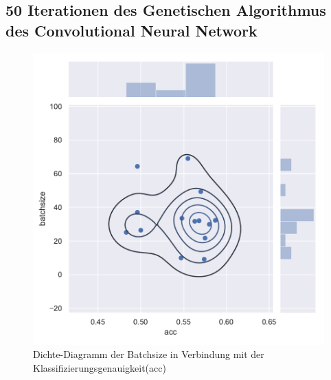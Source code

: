 \subsection{50 Iterationen des Genetischen Algorithmus des Convolutional Neural Network}
\begin{figure}[H]
  \centering  
  \includegraphics[scale=0.5]{anhang/GA_50_cifar10_True_big_jointplot_batchsize.pdf}
  \caption{Dichte-Diagramm der Batchsize in Verbindung mit der Klassifizierungsgenauigkeit(acc)}
  
\end{figure}

